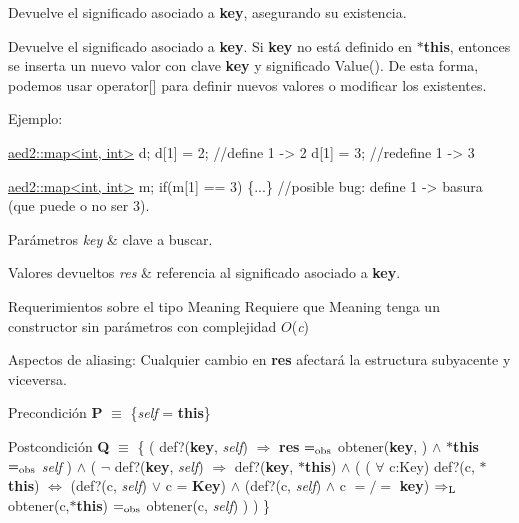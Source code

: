 Devuelve el significado asociado a {\bfseries key}, asegurando su existencia. 

Devuelve el significado asociado a {\bfseries key}. Si {\bfseries key} no está definido en {\bfseries $\ast$this}, entonces se inserta un nuevo valor con clave {\bfseries key} y significado Value(). De esta forma, podemos usar {\ttfamily operator\mbox{[}\mbox{]}} para definir nuevos valores o modificar los existentes.

Ejemplo\-: 
\begin{DoxyCode}
\hyperlink{classaed2_1_1map}{aed2::map<int, int>} d;
d[1] = 2;      \textcolor{comment}{//define 1 -> 2}
d[1] = 3;      \textcolor{comment}{//redefine 1 -> 3}

\hyperlink{classaed2_1_1map}{aed2::map<int, int>} m;
\textcolor{keywordflow}{if}(m[1] == 3) \{...\} \textcolor{comment}{//posible bug: define 1 -> basura (que puede o no ser}
3).
\end{DoxyCode}



\begin{DoxyParams}{Parámetros}
{\em key} & clave a buscar. \\
\hline
\end{DoxyParams}

\begin{DoxyRetVals}{Valores devueltos}
{\em res} & referencia al significado asociado a {\bfseries key}.\\
\hline
\end{DoxyRetVals}
\begin{DoxyParagraph}{Requerimientos sobre el tipo Meaning}
Requiere que Meaning tenga un constructor sin parámetros con complejidad $O$({\itshape c})
\end{DoxyParagraph}
\begin{DoxyParagraph}{Aspectos de aliasing\-:}
Cualquier cambio en {\bfseries res} afectará la estructura subyacente y viceversa.
\end{DoxyParagraph}
\begin{DoxyPrecond}{Precondición}
{\bfseries P} $\equiv$ \{{\itshape self} = {\bfseries this}\} 
\end{DoxyPrecond}
\begin{DoxyPostcond}{Postcondición}
{\bfseries Q} $\equiv$ \{ ( def?({\bfseries key}, {\itshape self}) $\Rightarrow$ {\bfseries res} $=_{\rm obs}$ obtener({\bfseries key}, ) $\land$ {\bfseries $\ast$this} $=_{\rm obs}$ {\itshape self} ) $\land$ ( $\lnot$ def?({\bfseries key}, {\itshape self}) $\Rightarrow$ def?({\bfseries key}, {\bfseries $\ast$this}) $\land$ ( ( $\forall$ c\-:Key) def?(c, {\bfseries $\ast$this}) $\Leftrightarrow$ (def?(c, {\itshape self}) $\lor$ c = {\bfseries Key}) $\land$ (def?(c, {\itshape self}) $\land$ c $=/=$ {\bfseries key}) $\Rightarrow_{\rm L}$ obtener(c,{\bfseries $\ast$this}) $=_{\rm obs}$ obtener(c, {\itshape self}) ) ) \}
\end{DoxyPostcond}

